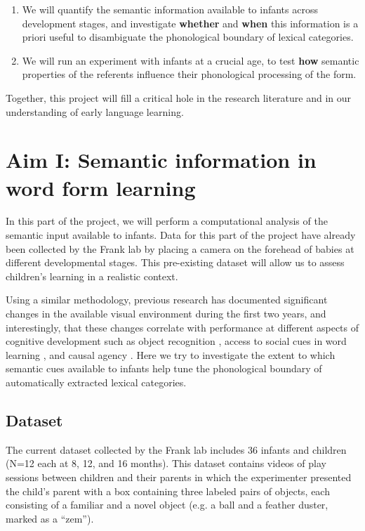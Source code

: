 \documentclass[12pt]{article}
\begin{document}
\begin{enumerate}
\item We will quantify the semantic information available to infants across development stages, and investigate \textbf{whether} and \textbf{when} this information is a priori useful to disambiguate the phonological boundary of lexical categories. 
\item We will run an experiment with infants at a crucial age, to test \textbf{how} semantic properties of the referents influence their phonological processing of the form.
\end{enumerate}

\noindent Together, this project will fill a critical hole in the research literature and in our understanding of early language learning. 


\section{Aim I: Semantic information in word form learning}

In this part of the project, we will perform a computational analysis of the semantic input available to infants. Data for this part of the project have already been collected by the Frank lab by placing a camera on the forehead of babies at different developmental stages. This pre-existing dataset will allow us to assess children's learning in a realistic context.

Using a similar methodology, previous research has documented significant changes in the available visual environment during the first two years, and interestingly, that these changes correlate with performance at different aspects of cognitive development such as object recognition \cite{james2013}, access to social cues in word learning \cite{frank2013}, and causal agency \cite{ciccino2011}.
Here we try to investigate the extent to which semantic cues available to infants help tune the phonological boundary of automatically extracted lexical categories. 

\subsection{Dataset}

The current dataset collected by the Frank lab includes 36 infants and children (N=12 each at 8, 12, and 16 months). This dataset contains videos of play sessions between children and their parents in which the experimenter presented the child’s parent with a box containing three labeled pairs of objects, each consisting of a familiar and a novel object (e.g. a ball and a feather duster, marked as a ``zem'').
\end{document}
